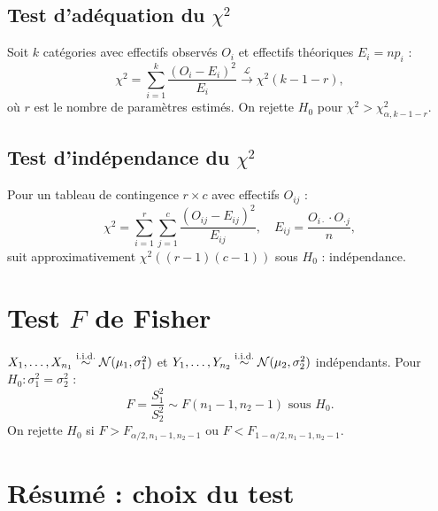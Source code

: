 \subsection{Test d'ad\'equation du $\chi^2$}

\begin{theoreme}
\label{thm:chi2-adequation}
Soit $k$ cat\'egories avec effectifs observ\'es $O_i$ et effectifs th\'eoriques $E_i=np_i$ :
\[
\chi^2 = \sum_{i=1}^k \frac{(O_i-E_i)^2}{E_i} \xrightarrow{\mathcal{L}} \chi^2(k-1-r),
\]
o\`u $r$ est le nombre de param\`etres estim\'es. On rejette $H_0$ pour $\chi^2>\chi^2_{\alpha,k-1-r}$.
\end{theoreme}

\subsection{Test d'ind\'ependance du $\chi^2$}

\begin{theoreme}
Pour un tableau de contingence $r\times c$ avec effectifs $O_{ij}$ :
\[
\chi^2 = \sum_{i=1}^r\sum_{j=1}^c \frac{(O_{ij}-E_{ij})^2}{E_{ij}}, \quad E_{ij}=\frac{O_{i\cdot}\cdot O_{\cdot j}}{n},
\]
suit approximativement $\chi^2((r-1)(c-1))$ sous $H_0$ : ind\'ependance.
\end{theoreme}

\section{Test $F$ de Fisher}
\label{sec:test-f}

\begin{theoreme}
$X_1,\ldots,X_{n_1}\overset{\text{i.i.d.}}{\sim}\mathcal{N}(\mu_1,\sigma_1^2)$ et $Y_1,\ldots,Y_{n_2}\overset{\text{i.i.d.}}{\sim}\mathcal{N}(\mu_2,\sigma_2^2)$ ind\'ependants. Pour $H_0:\sigma_1^2=\sigma_2^2$ :
\[
F = \frac{S_1^2}{S_2^2} \sim F(n_1-1,n_2-1) \text{ sous } H_0.
\]
On rejette $H_0$ si $F>F_{\alpha/2,n_1-1,n_2-1}$ ou $F<F_{1-\alpha/2,n_1-1,n_2-1}$.
\end{theoreme}

\section{R\'esum\'e : choix du test}

